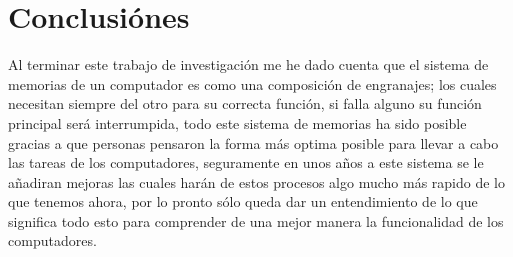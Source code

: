 \documentclass{article}
\begin{document}
\section{Conclusiónes}
Al terminar este trabajo de investigación me he dado cuenta que el sistema de memorias de un computador es como una composición de engranajes; los cuales necesitan siempre del otro para su correcta función, si falla alguno su función principal será interrumpida, todo este sistema de memorias ha sido posible gracias a que personas pensaron la forma más optima posible para llevar a cabo las tareas de los computadores, seguramente en unos años a este sistema se le añadiran mejoras las cuales harán de estos procesos algo mucho más rapido de lo que tenemos ahora, por lo pronto sólo queda dar un entendimiento de lo que significa todo esto para comprender de una mejor manera la funcionalidad de los computadores.


\end{document}
